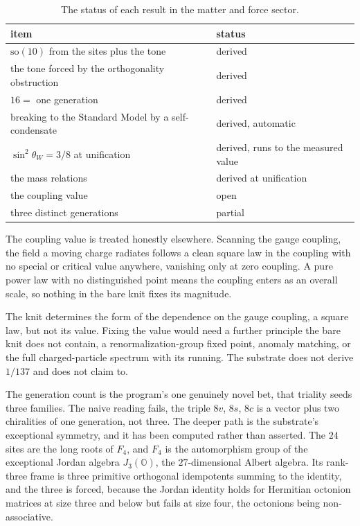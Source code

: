 \begin{table}[ht]
\centering
\begin{tabular}{@{}ll@{}}
\toprule
item & status \\
\midrule
$\mathrm{so}(10)$ from the sites plus the tone & derived \\
the tone forced by the orthogonality obstruction & derived \\
$16 =$ one generation & derived \\
breaking to the Standard Model by a self-condensate & derived, automatic \\
$\sin^2 \theta_W = 3/8$ at unification & derived, runs to the measured value \\
the mass relations & derived at unification \\
the coupling value & open \\
three distinct generations & partial \\
\bottomrule
\end{tabular}
\caption{The status of each result in the matter and force sector.}
\label{tab:sm-status}
\end{table}

The coupling value is treated honestly elsewhere. Scanning the gauge coupling, the field a moving charge radiates follows a clean square law in the coupling with no special or critical value anywhere, vanishing only at zero coupling. A pure power law with no distinguished point means the coupling enters as an overall scale, so nothing in the bare knit fixes its magnitude.

\begin{principle}
The knit determines the form of the dependence on the gauge coupling, a square law, but not its value. Fixing the value would need a further principle the bare knit does not contain, a renormalization-group fixed point, anomaly matching, or the full charged-particle spectrum with its running. The substrate does not derive $1/137$ and does not claim to.
\end{principle}

The generation count is the program's one genuinely novel bet, that triality seeds three families. The naive reading fails, the triple $8v$, $8s$, $8c$ is a vector plus two chiralities of one generation, not three. The deeper path is the substrate's exceptional symmetry, and it has been computed rather than asserted. The $24$ sites are the long roots of $F_4$, and $F_4$ is the automorphism group of the exceptional Jordan algebra $J_3(\mathbb{O})$, the $27$-dimensional Albert algebra. Its rank-three frame is three primitive orthogonal idempotents summing to the identity, and the three is forced, because the Jordan identity holds for Hermitian octonion matrices at size three and below but fails at size four, the octonions being non-associative.

